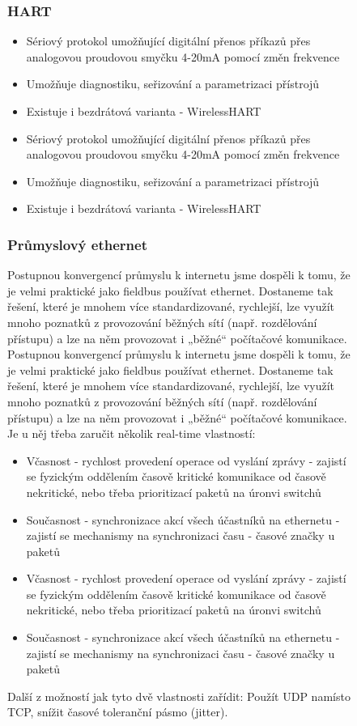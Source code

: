 \begin{figure}[h]
\subsubsection*{HART}
\begin{itemize}
  \item Sériový protokol umožňující digitální přenos příkazů přes analogovou proudovou smyčku 4-20mA pomocí změn frekvence
  \item Umožňuje diagnostiku, seřizování a parametrizaci přístrojů
  \item Existuje i bezdrátová varianta - WirelessHART
    \item Sériový protokol umožňující digitální přenos příkazů přes analogovou proudovou smyčku 4-20mA pomocí změn frekvence
    \item Umožňuje diagnostiku, seřizování a parametrizaci přístrojů
    \item Existuje i bezdrátová varianta - WirelessHART
\end{itemize}

\subsubsection*{Průmyslový ethernet}
Postupnou konvergencí průmyslu k internetu jsme dospěli k tomu, že je velmi praktické jako fieldbus používat ethernet. Dostaneme tak řešení, které je mnohem více standardizované, rychlejší, lze využít mnoho poznatků z provozování běžných sítí (např. rozdělování přístupu) a lze na něm provozovat i „běžné“ počítačové komunikace. 
Postupnou konvergencí průmyslu k internetu jsme dospěli k tomu, že je velmi praktické jako fieldbus používat ethernet. Dostaneme tak řešení, které je mnohem více standardizované, rychlejší, lze využít mnoho poznatků z provozování běžných sítí (např. rozdělování přístupu) a lze na něm provozovat i „běžné“ počítačové komunikace.
Je u něj třeba zaručit několik real-time vlastností:
\begin{itemize}
  \item Včasnost - rychlost provedení operace od vyslání zprávy - zajistí se fyzickým oddělením časově kritické komunikace od časově nekritické, nebo třeba prioritizací paketů na úronvi switchů
  \item Současnost - synchronizace akcí všech účastníků na ethernetu - zajistí se mechanismy na synchronizaci času - časové značky u paketů
    \item Včasnost - rychlost provedení operace od vyslání zprávy - zajistí se fyzickým oddělením časově kritické komunikace od časově nekritické, nebo třeba prioritizací paketů na úronvi switchů
    \item Současnost - synchronizace akcí všech účastníků na ethernetu - zajistí se mechanismy na synchronizaci času - časové značky u paketů
\end{itemize}
Další z možností jak tyto dvě vlastnosti zařídit: Použít UDP namísto TCP, snížit časové toleranční pásmo (jitter).


\end{figure}
